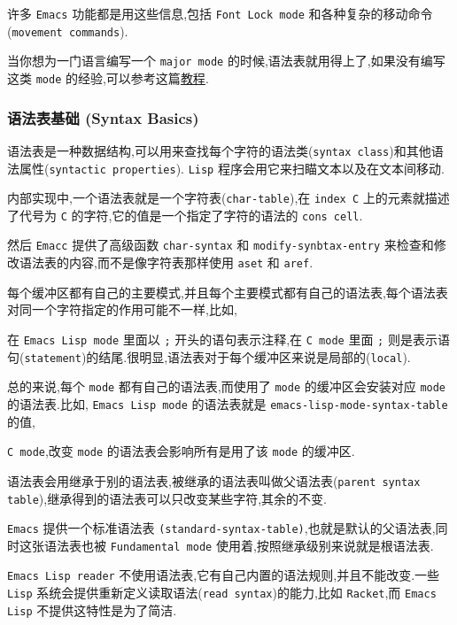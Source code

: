 \documentclass[11pt]{article}
\begin{document}
许多 \texttt{Emacs} 功能都是用这些信息,包括 \texttt{Font Lock mode} 和各种复杂的移动命令(\texttt{movement commands}).

当你想为一门语言编写一个 \texttt{major mode} 的时候,语法表就用得上了,如果没有编写这类 \texttt{mode} 的经验,可以参考这篇\href{https://www.emacswiki.org/emacs/ModeTutorial}{教程}.

\subsubsection{语法表基础 (Syntax Basics)}
\label{sec:org49d1f1b}

语法表是一种数据结构,可以用来查找每个字符的语法类(\texttt{syntax class})和其他语法属性(\texttt{syntactic properties}). \texttt{Lisp} 程序会用它来扫瞄文本以及在文本间移动.

内部实现中,一个语法表就是一个字符表(\texttt{char-table}),在 \texttt{index C} 上的元素就描述了代号为 \texttt{C} 的字符,它的值是一个指定了字符的语法的 \texttt{cons cell}.

然后 \texttt{Emacc} 提供了高级函数 \texttt{char-syntax} 和 \texttt{modify-synbtax-entry} 来检查和修改语法表的内容,而不是像字符表那样使用 \texttt{aset} 和 \texttt{aref}.

每个缓冲区都有自己的主要模式,并且每个主要模式都有自己的语法表,每个语法表对同一个字符指定的作用可能不一样,比如,

在 \texttt{Emacs Lisp mode} 里面以 \texttt{;} 开头的语句表示注释,在 \texttt{C mode} 里面 \texttt{;} 则是表示语句(\texttt{statement})的结尾.很明显,语法表对于每个缓冲区来说是局部的(\texttt{local}).

总的来说,每个 \texttt{mode} 都有自己的语法表,而使用了 \texttt{mode} 的缓冲区会安装对应 \texttt{mode} 的语法表.比如, \texttt{Emacs Lisp mode} 的语法表就是 \texttt{emacs-lisp-mode-syntax-table} 的值,

\texttt{C mode},改变 \texttt{mode} 的语法表会影响所有是用了该 \texttt{mode} 的缓冲区.

语法表会用继承于别的语法表,被继承的语法表叫做父语法表(\texttt{parent syntax table}),继承得到的语法表可以只改变某些字符,其余的不变.

\texttt{Emacs} 提供一个标准语法表 \texttt{(standard-syntax-table)},也就是默认的父语法表,同时这张语法表也被 \texttt{Fundamental mode} 使用着,按照继承级别来说就是根语法表.

\texttt{Emacs Lisp reader} 不使用语法表,它有自己内置的语法规则,并且不能改变.一些 \texttt{Lisp} 系统会提供重新定义读取语法(\texttt{read syntax})的能力,比如 \texttt{Racket},而 \texttt{Emacs Lisp} 不提供这特性是为了简洁.
\end{document}
